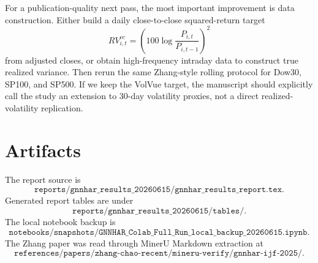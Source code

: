 \documentclass[11pt]{article}
\begin{document}
For a publication-quality next pass, the most important improvement is data construction.
Either build a daily close-to-close squared-return target
\[
  RV^{cc}_{i,t}
  =
  \left(100\log\frac{P_{i,t}}{P_{i,t-1}}\right)^2
\]
from adjusted closes, or obtain high-frequency intraday data to construct true realized variance.
Then rerun the same Zhang-style rolling protocol for Dow30, SP100, and SP500.
If we keep the VolVue target, the manuscript should explicitly call the study an extension to 30-day volatility proxies, not a direct realized-volatility replication.

\appendix
\section{Artifacts}

The report source is
\[
  \texttt{reports/gnnhar\_results\_20260615/gnnhar\_results\_report.tex}.
\]
Generated report tables are under
\[
  \texttt{reports/gnnhar\_results\_20260615/tables/}.
\]
The local notebook backup is
\[
  \texttt{notebooks/snapshots/GNNHAR\_Colab\_Full\_Run\_local\_backup\_20260615.ipynb}.
\]
The Zhang paper was read through MinerU Markdown extraction at
\[
  \texttt{references/papers/zhang-chao-recent/mineru-verify/gnnhar-ijf-2025/}.
\]
\end{document}
